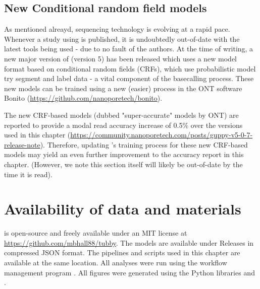 \subsection{New Conditional random field models}
As mentioned alreayd, \ont{} sequencing technology is evolving at a rapid pace. Whenever a study using \ont{} is published, it is undoubtedly out-of-date with the latest tools being used - due to no fault of the authors. At the time of writing, a new major version of \guppy{} (version 5) has been released which uses a new model format based on conditional random fields (CRFs), which use probabilistic model try segment and label data \cite{Lafferty2001} - a vital component of the basecalling process. These new models can be trained using a new (easier) process in the ONT software Bonito (\url{https://github.com/nanoporetech/bonito}).

The new CRF-based models (dubbed "super-accurate" models by ONT) are reported to provide a modal read accuracy increase of 0.5\% over the \guppy{} versions used in this chapter (\url{https://community.nanoporetech.com/posts/guppy-v5-0-7-release-note}). Therefore, updating \tubby{}'s training process for these new CRF-based models may yield an even further improvement to the accuracy report in this chapter. (However, we note this section itself will likely be out-of-date by the time it is read). 

\section{Availability of data and materials}


\tubby{} is open-source and freely available under an MIT license at \url{https://github.com/mbhall88/tubby}. The models are available under Releases in compressed JSON format. The pipelines and scripts used in this chapter are available at the same location. All analyses were run using the workflow management program  \cite{snakemake2021}. All figures were generated using the Python libraries  \cite{matplotlib} and  \cite{seaborn}.

